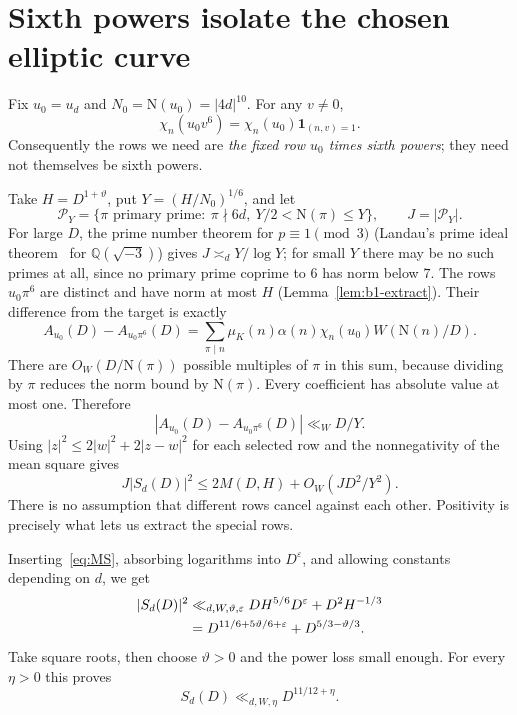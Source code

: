 \documentclass[11pt]{article}
\numberwithin{equation}{section}
\newcommand{\N}{\mathrm N}
\newcommand{\muk}{\mu_K}
\newcommand{\ind}{\mathbf1}
\begin{document}
\section{Sixth powers isolate the chosen elliptic curve}\label{sec:sixth}

Fix $u_0=u_d$ and $N_0=\N(u_0)=|4d|^{10}$. For any $v\ne0$,
\begin{equation}\label{eq:d020}
 \chi_n(u_0v^6)=\chi_n(u_0)\ind_{(n,v)=1}.
\end{equation}
Consequently the rows we need are \emph{the fixed row $u_0$ times sixth
powers}; they need not themselves be sixth powers.

Take $H=D^{1+\vartheta}$, put $Y=(H/N_0)^{1/6}$, and let
\begin{equation}\label{eq:d021}
 \mathcal P_Y=\{\pi\text{ primary prime}:\ \pi\nmid6d,
                                      \ Y/2<\N(\pi)\le Y\},
 \qquad J=|\mathcal P_Y|.
\end{equation}
For large $D$, the prime number theorem for $p\equiv1\pmod3$ (Landau's prime ideal theorem~\cite{Lan03} for $\mathbb Q(\sqrt{-3})$) gives
$J\asymp_d Y/\log Y$; for small $Y$ there may be no such primes at all, since no primary prime
coprime to $6$ has norm below $7$. The rows $u_0\pi^6$ are distinct and have norm
at most $H$ (Lemma~\ref{lem:b1-extract}). Their difference from the target is exactly
\begin{equation}\label{eq:d022}
 A_{u_0}(D)-A_{u_0\pi^6}(D)
 =\sum_{\pi\mid n}\muk(n)\alpha(n)\chi_n(u_0)W(\N(n)/D).
\end{equation}
There are $O_W(D/\N(\pi))$ possible multiples of $\pi$ in this sum,
because dividing by $\pi$ reduces the norm bound by $\N(\pi)$.
Every coefficient has absolute value at most one. Therefore
\begin{equation}\label{eq:approx}
 |A_{u_0}(D)-A_{u_0\pi^6}(D)|\ll_W D/Y.
\end{equation}
Using $|z|^2\le2|w|^2+2|z-w|^2$ for each selected row and the
nonnegativity of the mean square gives
\begin{equation}\label{eq:extraction}
 \boxed{\quad J|S_d(D)|^2
 \le2M(D,H)+O_W(JD^2/Y^2).\quad}
\end{equation}
There is no assumption that different rows cancel against each other.
Positivity is precisely what lets us extract the special rows.

Inserting~\eqref{eq:MS}, absorbing logarithms into $D^\varepsilon$, and
allowing constants depending on $d$, we get
\begin{align}
 |S_d(D)|^2
 &\ll_{d,W,\vartheta,\varepsilon}
          DH^{5/6}D^\varepsilon+D^2H^{-1/3}\notag\\
 &=D^{11/6+5\vartheta/6+\varepsilon}
                  +D^{5/3-\vartheta/3}.\label{eq:exponents}
\end{align}
Take square roots, then choose $\vartheta>0$ and the power loss small
enough. For every $\eta>0$ this proves
\begin{equation}\label{eq:Sbound}
 S_d(D)\ll_{d,W,\eta}D^{11/12+\eta}.
\end{equation}
\end{document}
